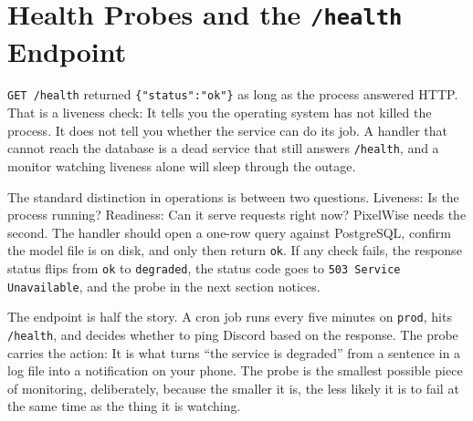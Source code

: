 


\newpage
\section{Health Probes and the \texttt{/health} Endpoint}

\texttt{GET /health} returned \texttt{\{"status":"ok"\}} as long as the
process answered HTTP. That is a liveness check: It tells you the
operating system has not killed the process. It does not tell you
whether the service can do its job. A handler that cannot reach the
database is a dead service that still answers \texttt{/health}, and a
monitor watching liveness alone will sleep through the outage.

The standard distinction in operations is between two questions.
Liveness: Is the process running? Readiness: Can it serve requests
right now? PixelWise needs the second. The handler should open a one-row
query against PostgreSQL, confirm the model file is on disk, and only
then return \texttt{ok}. If any check fails, the response status flips
from \texttt{ok} to \texttt{degraded}, the status code goes to
\texttt{503 Service Unavailable}, and the probe in the next section
notices.


The endpoint is half the story. A cron job runs every five minutes on
\texttt{prod}, hits \texttt{/health}, and decides whether to ping
Discord based on the response. The probe carries the action: It is what
turns ``the service is degraded'' from a sentence in a log file into a
notification on your phone. The probe is the smallest possible piece of
monitoring, deliberately, because the smaller it is, the less likely it
is to fail at the same time as the thing it is watching.

